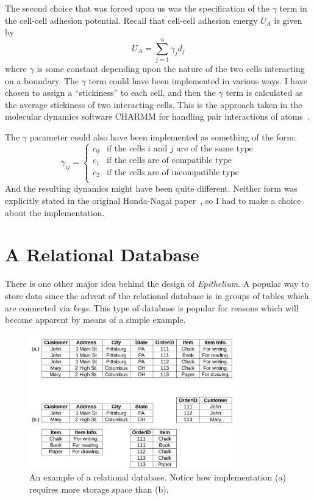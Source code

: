 The second choice that was forced upon us was the specification of the $\gamma$ term in the cell-cell adhesion potential. Recall that cell-cell adhesion energy $U_A$ is given by
\begin{equation}U_A = \displaystyle\sum\limits_{j = 1}^{n}\gamma_{j}d_{j}\end{equation}
where  $\gamma$ is some constant depending upon the nature of the two cells interacting on a boundary. The $\gamma$ term could have been implemented in various ways. I have chosen to assign a ``stickiness'' to each cell, and then the $\gamma$ term is calculated as the average stickiness of two interacting cells. This is the approach taken in the molecular dynamics software CHARMM for handling pair interactions of atoms~\cite{CHARMM}.

The $\gamma$ parameter could also have been implemented as something of the form:
\[  \gamma_{ij} =  \left\{
\begin{array}{ll}
      c_0 & \textrm{if the cells $i$ and $j$ are of the same type} \\
      c_1 &  \textrm{if the cells are of compatible type}\\
      c_2 & \textrm{if the cells are of incompatible type} \\
\end{array} 
\right. \]
And the resulting dynamics might have been quite different. Neither form was explicitly stated in the original Honda-Nagai paper~\cite{HondaNagai}, so I had to make a choice about the implementation.

\section{A Relational Database}
There is one other major idea behind the design of \emph{Epithelium}. A 
popular way to store data since the advent of the relational database is in groups of tables which are connected via \emph{keys}. This type of database is popular for reasons which will become apparent by means of a simple example. 

\begin{figure}
\centering
\includegraphics[width=0.8\textwidth]{../diagrams/relationaldb.png}
\caption[An example of a relational database.]{An example of a relational database. Notice how implementation (a) requires more storage space than (b).}
\label{fig:rdb}
\end{figure}

